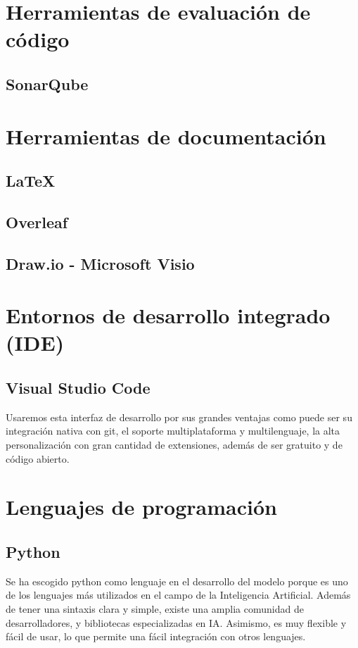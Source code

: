 \section{Herramientas de evaluación de código}

\subsection{SonarQube}

\section{Herramientas de documentación}

\subsection{\LaTeX}

\subsection{Overleaf}

\subsection{Draw.io - Microsoft Visio}

\section{Entornos de desarrollo integrado (IDE)}

\subsection{Visual Studio Code}
Usaremos esta interfaz de desarrollo por sus grandes ventajas como puede ser su integración nativa con git, el soporte multiplataforma y multilenguaje, la alta personalización con gran cantidad de extensiones, además de ser gratuito y de código abierto.

\section{Lenguajes de programación}

\subsection{Python}
Se ha escogido python como lenguaje en el desarrollo del modelo porque es uno de los lenguajes más utilizados en el campo de la Inteligencia Artificial. Además de tener una sintaxis clara y simple, existe una amplia comunidad de desarrolladores, y bibliotecas especializadas en IA. Asimismo, es muy flexible y fácil de usar, lo que permite una fácil integración con otros lenguajes.

